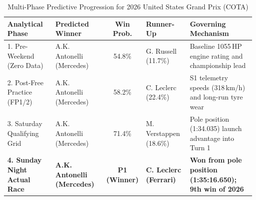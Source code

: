 \documentclass[12pt,a4paper]{report}
\begin{document}
\begin{table}[H]
\centering
\small
\begin{tabularx}{\textwidth}{l p{2.8cm} c p{2.5cm} X}
\toprule
\rowcolor{gray!15}
\textbf{Analytical Phase} & \textbf{Predicted Winner} & \textbf{Win Prob.} & \textbf{Runner-Up} & \textbf{Governing Mechanism} \\
\midrule
1. Pre-Weekend (Zero Data) & A.K. Antonelli (Mercedes) & 54.8\% & G. Russell (11.7\%) & Baseline 1055\,HP engine rating and championship lead \\
2. Post-Free Practice (FP1/2) & A.K. Antonelli (Mercedes) & 58.2\% & C. Leclerc (22.4\%) & S1 telemetry speeds (318\,km/h) and long-run tyre wear \\
3. Saturday Qualifying Grid & A.K. Antonelli (Mercedes) & 71.4\% & M. Verstappen (18.6\%) & Pole position (1:34.035) launch advantage into Turn 1 \\
\midrule
\rowcolor{gray!8}
\textbf{4. Sunday Night Actual Race} & \textbf{A.K. Antonelli (Mercedes)} & \textbf{P1 (Winner)} & \textbf{C. Leclerc (Ferrari)} & \textbf{Won from pole position (1:35:16.650); 9th win of 2026} \\
\bottomrule
\end{tabularx}
\caption{Multi-Phase Predictive Progression for 2026 United States Grand Prix (COTA)}
\label{tab:cota_evolution}
\end{table}
\end{document}
